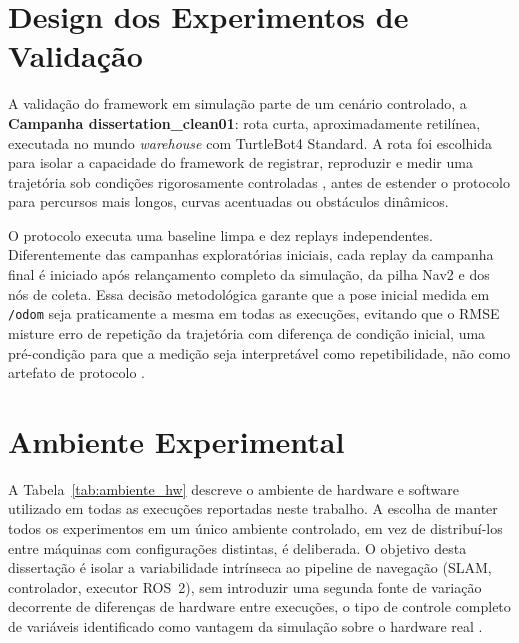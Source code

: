 \section{Design dos Experimentos de Validação}
\label{sec:design_experimentos}

A validação do framework em simulação parte de um cenário controlado, a
\textbf{Campanha dissertation\_clean01}: rota curta, aproximadamente retilínea,
executada no mundo \textit{warehouse} com TurtleBot4 Standard. A rota foi
escolhida para isolar a capacidade do framework de registrar, reproduzir e medir
uma trajetória sob condições rigorosamente controladas \cite{amigoni2010}, antes
de estender o protocolo para percursos mais longos, curvas acentuadas ou
obstáculos dinâmicos.

O protocolo executa uma baseline limpa e dez replays independentes. Diferentemente
das campanhas exploratórias iniciais, cada replay da campanha final é iniciado
após relançamento completo da simulação, da pilha Nav2 e dos nós de coleta. Essa
decisão metodológica garante que a pose inicial medida em \texttt{/\allowbreak odom}
seja praticamente a mesma em todas as execuções, evitando que o RMSE misture erro
de repetição da trajetória com diferença de condição inicial, uma pré-condição
para que a medição seja interpretável como repetibilidade, não como artefato de
protocolo \cite{bonsignorio2015}.


\section{Ambiente Experimental}
\label{sec:ambiente_hw}

A Tabela~\ref{tab:ambiente_hw} descreve o ambiente de hardware e software
utilizado em todas as execuções reportadas neste trabalho. A escolha de manter
todos os experimentos em um único ambiente controlado, em vez de distribuí-los
entre máquinas com configurações distintas, é deliberada. O objetivo desta
dissertação é isolar a variabilidade intrínseca ao pipeline de navegação
(SLAM, controlador, executor ROS~2), sem introduzir uma segunda fonte de
variação decorrente de diferenças de hardware entre execuções, o tipo de
controle completo de variáveis identificado como vantagem da simulação sobre
o hardware real \cite{amigoni2010}.


